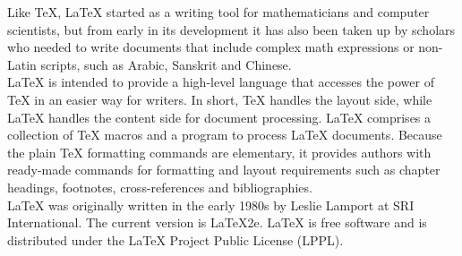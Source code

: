 {Like TeX, LaTeX started as a writing tool for mathematicians and computer scientists, but from early in its development it has also been taken up by scholars who needed to write documents that include complex math expressions or non-Latin scripts, such as Arabic, Sanskrit and Chinese.\\
LaTeX is intended to provide a high-level language that accesses the power of TeX in an easier way for writers. In short, TeX handles the layout side, while LaTeX handles the content side for document processing. LaTeX comprises a collection of TeX macros and a program to process LaTeX documents. Because the plain TeX formatting commands are elementary, it provides authors with ready-made commands for formatting and layout requirements such as chapter headings, footnotes, cross-references and bibliographies.\\
LaTeX was originally written in the early 1980s by Leslie Lamport at SRI International. The current version is LaTeX2e. LaTeX is free software and is distributed under the LaTeX Project Public License (LPPL).
}